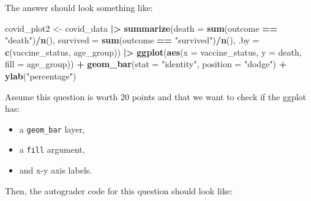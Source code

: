 \documentclass[
  12pt,
]{book}
\newenvironment{Shaded}{\begin{snugshade}}{\end{snugshade}}
\newcommand{\AttributeTok}[1]{\textcolor[rgb]{0.13,0.29,0.53}{#1}}
\newcommand{\FunctionTok}[1]{\textcolor[rgb]{0.13,0.29,0.53}{\textbf{#1}}}
\newcommand{\NormalTok}[1]{#1}
\newcommand{\OtherTok}[1]{\textcolor[rgb]{0.56,0.35,0.01}{#1}}
\newcommand{\SpecialCharTok}[1]{\textcolor[rgb]{0.81,0.36,0.00}{\textbf{#1}}}
\newcommand{\StringTok}[1]{\textcolor[rgb]{0.31,0.60,0.02}{#1}}
\providecommand{\tightlist}{%
  \setlength{\itemsep}{0pt}\setlength{\parskip}{0pt}}
\begin{document}
The answer should look something like:

\begin{Shaded}
\begin{Highlighting}[]
\NormalTok{covid\_plot2 }\OtherTok{\textless{}{-}}\NormalTok{ covid\_data }\SpecialCharTok{|\textgreater{}} 
  \FunctionTok{summarize}\NormalTok{(}\AttributeTok{death =} \FunctionTok{sum}\NormalTok{(outcome }\SpecialCharTok{==} \StringTok{"death"}\NormalTok{)}\SpecialCharTok{/}\FunctionTok{n}\NormalTok{(),}
            \AttributeTok{survived =} \FunctionTok{sum}\NormalTok{(outcome }\SpecialCharTok{==} \StringTok{"survived"}\NormalTok{)}\SpecialCharTok{/}\FunctionTok{n}\NormalTok{(),}
            \AttributeTok{.by =} \FunctionTok{c}\NormalTok{(vaccine\_status, age\_group)) }\SpecialCharTok{|\textgreater{}}
    \FunctionTok{ggplot}\NormalTok{(}\FunctionTok{aes}\NormalTok{(}\AttributeTok{x =}\NormalTok{ vaccine\_status, }\AttributeTok{y =}\NormalTok{ death, }\AttributeTok{fill =}\NormalTok{ age\_group)) }\SpecialCharTok{+}
    \FunctionTok{geom\_bar}\NormalTok{(}\AttributeTok{stat =} \StringTok{"identity"}\NormalTok{, }\AttributeTok{position =} \StringTok{"dodge"}\NormalTok{) }\SpecialCharTok{+}
    \FunctionTok{ylab}\NormalTok{(}\StringTok{"percentage"}\NormalTok{) }
\end{Highlighting}
\end{Shaded}

Assume this question is worth 20 points and that we want to check if the ggplot has:

\begin{itemize}
\tightlist
\item
  a \texttt{geom\_bar} layer,
\item
  a \texttt{fill} argument,
\item
  and x-y axis labels.
\end{itemize}

Then, the autograder code for this question should look like:
\end{document}
